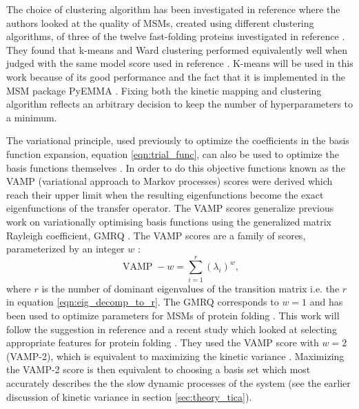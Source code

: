 The choice of clustering algorithm has been investigated in reference \cite{husicWardClusteringImproves2017a} where the authors looked at the quality of MSMs, created using different clustering algorithms, of three of the twelve fast-folding proteins investigated in reference \cite{husicOptimizedParameterSelection2016}. They found that k-means and Ward clustering performed equivalently well when judged with the same model score used in reference \cite{husicOptimizedParameterSelection2016}.  K-means will be used in this work because of its good performance and the fact that it is implemented in the MSM package PyEMMA \cite{schererPyEMMASoftwarePackage2015a}. Fixing both the kinetic mapping and clustering algorithm reflects an arbitrary decision to keep the number of hyperparameters to a minimum.

The variational principle, used previously to optimize the coefficients in the basis function expansion, equation \ref{eqn:trial_func}, can also be used to optimize the basis functions themselves \cite{schererVariationalSelectionFeatures2019,husicOptimizedParameterSelection2016}. In order to do this objective functions known as the VAMP (variational approach to Markov processes) scores \cite{wuVariationalApproachLearning2020c} were derived which reach their upper limit when the resulting eigenfunctions become the exact eigenfunctions of the transfer operator. The VAMP scores generalize previous work on variationally optimising basis functions using the generalized matrix Rayleigh coefficient, GMRQ \cite{mcgibbonVariationalCrossvalidationSlow2015}. The VAMP scores are a family of scores, parameterized by an integer $w$ \cite{wuVariationalApproachLearning2020c}:
\begin{equation}\label{eqn:def_vampr}
\operatorname{VAMP}-w=\sum_{i=1}^{r}\left(\lambda_{i}\right)^{w}, 
\end{equation} 
where $r$ is the number of dominant eigenvalues of the transition matrix i.e. the $r$ in equation \ref{eqn:eig_decomp_to_r}. The GMRQ corresponds to $w=1$ and has been used to optimize parameters for MSMs of protein folding \cite{husicOptimizedParameterSelection2016}. This work will follow the suggestion in reference \cite{wuVariationalApproachLearning2020c} and a recent study which looked at selecting appropriate features for protein folding \cite{schererVariationalSelectionFeatures2019}. They used the VAMP score with $w=2$ (VAMP-2), which is equivalent to maximizing the kinetic variance \cite{wuVariationalApproachLearning2020c}. Maximizing the VAMP-2 score is then equivalent to choosing a basis set which most accurately describes the the slow dynamic processes of the system (see the earlier discussion of kinetic variance in section \ref{sec:theory_tica}). 

